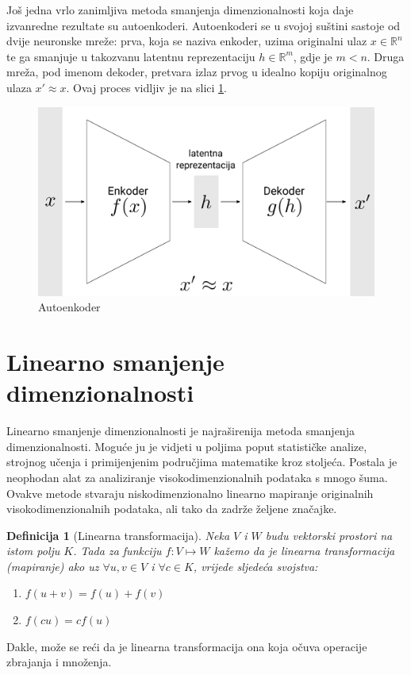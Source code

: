 \documentclass[times, utf8, diplomski]{fer}
\newtheorem{definition}{Definicija}         %
\begin{document}
\medskip
Još jedna vrlo zanimljiva metoda smanjenja dimenzionalnosti koja daje izvanredne rezultate su autoenkoderi. Autoenkoderi se u svojoj suštini sastoje od dvije neuronske mreže: prva, koja se naziva enkoder, uzima originalni ulaz \(x \in \mathbb{R}^n\) te ga smanjuje u takozvanu latentnu reprezentaciju \(h \in \mathbb{R}^m\), gdje je \(m < n\). Druga mreža, pod imenom dekoder, pretvara izlaz prvog u idealno kopiju originalnog ulaza \(x' \approx x\). Ovaj proces vidljiv je na slici \ref{fig:autoencoder}.

\begin{figure}[htb]
    \centering
    \includegraphics[width=12cm]{resources/images/reduction/autoencoder.png}
    \caption{Autoenkoder}
    \label{fig:autoencoder}
\end{figure}

\section{Linearno smanjenje dimenzionalnosti}\label{sec:lin_reduc}

Linearno smanjenje dimenzionalnosti  je najraširenija metoda smanjenja dimenzionalnosti. Moguće ju je vidjeti u poljima poput statističke analize, strojnog učenja i primijenjenim područjima matematike kroz stoljeća. Postala je neophodan alat za analiziranje visokodimenzionalnih podataka s mnogo šuma. Ovakve metode stvaraju niskodimenzionalno linearno mapiranje originalnih visokodimenzionalnih podataka, ali tako da zadrže željene značajke.

\begin{definition}[Linearna transformacija]
    Neka $V$ i $W$ budu vektorski prostori na istom polju $K$. Tada za funkciju $f: V \mapsto W$ kažemo da je linearna transformacija (mapiranje) ako uz $\forall u,v \in V$ i $\forall c \in K$, vrijede sljedeća svojstva:
    \begin{center}
        \begin{varwidth}{\textwidth}
            \begin{enumerate}
                \item $f(u + v) = f(u) + f(v)$
                \item $f(cu) = cf(u)$
            \end{enumerate}
        \end{varwidth}
    \end{center}
\end{definition}
Dakle, može se reći da je linearna transformacija ona koja očuva operacije zbrajanja i množenja.
\end{document}
